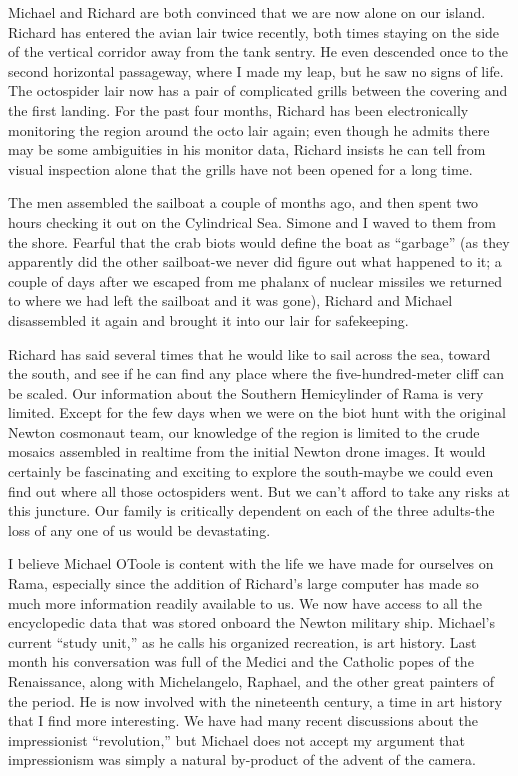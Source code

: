 \documentclass[]{article}
\begin{document}
Michael and Richard are both convinced that we are now alone on our island.  Richard has entered the avian lair twice recently, both times staying on the side of the vertical corridor away from the tank sentry.  He even descended once to the second horizontal passageway, where I made my leap, but he saw no signs of life.  The octospider lair now has a pair of complicated grills between the covering and the first landing.  For the past four months, Richard has been electronically monitoring the region around the octo lair again; even though he admits there may be some ambiguities in his monitor data, Richard insists he can tell from visual inspection alone that the grills have not been opened for a long time.

The men assembled the sailboat a couple of months ago, and then spent two hours checking it out on the Cylindrical Sea.  Simone and I waved to them from the shore.  Fearful that the crab biots would define the boat as “garbage” (as they apparently did the other sailboat-we never did figure out what happened to it; a couple of days after we escaped from me phalanx of nuclear missiles we returned to where we had left the sailboat and it was gone), Richard and Michael disassembled it again and brought it into our lair for safekeeping.

Richard has said several times that he would like to sail across the sea, toward the south, and see if he can find any place where the five-hundred-meter cliff can be scaled.  Our information about the Southern Hemicylinder of Rama is very limited.  Except for the few days when we were on the biot hunt with the original Newton cosmonaut team, our knowledge of the region is limited to the crude mosaics assembled in realtime from the initial Newton drone images.  It would certainly be fascinating and exciting to explore the south-maybe we could even find out where all those octospiders went.  But we can’t afford to take any risks at this juncture.  Our family is critically dependent on each of the three adults-the loss of any one of us would be devastating.

I believe Michael OToole is content with the life we have made for ourselves on Rama, especially since the addition of Richard’s large computer has made so much more information readily available to us.  We now have access to all the encyclopedic data that was stored onboard the Newton military ship.  Michael’s current “study unit,” as he calls his organized recreation, is art history.  Last month his conversation was full of the Medici and the Catholic popes of the Renaissance, along with Michelangelo, Raphael, and the other great painters of the period.  He is now involved with the nineteenth century, a time in art history that I find more interesting.  We have had many recent discussions about the impressionist “revolution,” but Michael does not accept my argument that impressionism was simply a natural by-product of the advent of the camera.
\end{document}
